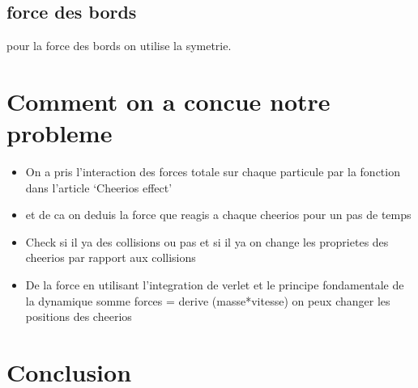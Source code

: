 \documentclass[a4paper, 11pt, oneside]{article} %
\begin{document}
    \subsection{force des bords}
    pour la force des bords on utilise la symetrie.
        


\section{Comment on a concue notre probleme}
    \begin{itemize}
        \item On a pris l'interaction des forces totale sur chaque particule par la fonction dans l'article `Cheerios effect'
        \item et de ca on deduis la force que reagis a chaque cheerios pour un pas de temps 
        \item Check si il ya des collisions ou pas et si il ya on change les proprietes des cheerios par rapport aux collisions
        \item De la force en utilisant l'integration de verlet et le principe fondamentale de la dynamique somme forces = derive (masse*vitesse) on peux changer les positions des cheerios
    \end{itemize}
\section*{Conclusion}

\newpage
\thispagestyle{empty}
\nocite{*}
\printbibliography[title = Bibliographie]
\end{document}
